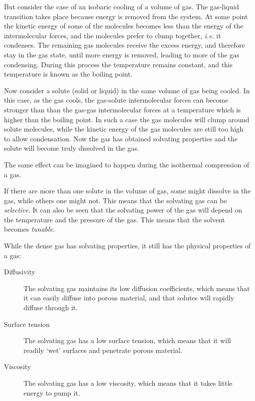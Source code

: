 But consider the case of an isobaric cooling of a volume of gas. The gas-liquid
transition takes place because energy is removed from the system. At some point
the kinetic energy of some of the molecules becomes less than the energy of the
intermolecular forces, and the molecules prefer to clump together, \textit{i.e.}
it condenses. The remaining gas molecules receive the excess energy, and
therefore stay in the gas state, until more energy is removed, leading to more
of the gas condensing. During this process the temperature remains constant, and
this temperature is known as the boiling point.

Now consider a solute (solid or liquid) in the same volume of gas being cooled.
In this case, as the gas cools, the gas-solute intermolecular forces can become
stronger than than the gas-gas intermolecular forces at a temperature which is
higher than the boiling point. In such a case the gas molecules will clump
around solute molecules, while the kinetic energy of the gas molecules are still
too high to allow condensation. Now the gas has obtained solvating properties
and the solute will become truly dissolved in the gas.

The same effect can be imagined to happen during the isothermal compression of a
gas.

If there are more than one solute in the volume of gas, some might dissolve in
the gas, while others one might not. This means that the solvating gas can be
\textit{selective}. It can also be seen that the solvating power of the gas will
depend on the temperature and the pressure of the gas. This means that the
solvent becomes \textit{tunable}.

While the dense gas has solvating properties, it still has the physical
properties of a gas:

\begin{description} 

\item[Diffusivity] The solvating gas maintains its low diffusion coefficients,
which means that it can easily diffuse into porous material, and that solutes
will rapidly diffuse through it.

\item[Surface tension] The solvating gas has a low surface tension, which means
that it will readily `wet' surfaces and penetrate porous material.

\item[Viscosity] The solvating gas has a low viscosity, which means that it
takes little energy to pump it.

\end{description} 

